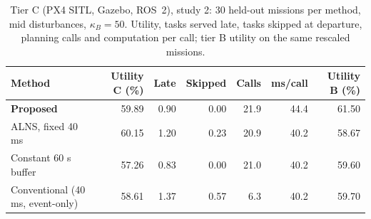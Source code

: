 \begin{table}[t]
\caption{Tier C (PX4 SITL, Gazebo, ROS~2), study 2: 30 held-out missions per method, mid disturbances, $\kappa_B=50$. Utility, tasks served late, tasks skipped at departure, planning calls and computation per call; tier B utility on the same rescaled missions.}\label{tab:s2tierc}
\centering\small
\begin{tabular}{lrrrrrr}
\toprule
Method & Utility C (\%) & Late & Skipped & Calls & ms/call & Utility B (\%) \\
\midrule
\textbf{Proposed} & 59.89 & 0.90 & 0.00 & 21.9 & 44.4 & 61.50 \\
ALNS, fixed 40 ms & 60.15 & 1.20 & 0.23 & 20.9 & 40.2 & 58.67 \\
Constant 60 s buffer & 57.26 & 0.83 & 0.00 & 21.0 & 40.2 & 59.60 \\
Conventional (40 ms, event-only) & 58.61 & 1.37 & 0.57 & 6.3 & 40.2 & 59.70 \\
\bottomrule
\end{tabular}
\end{table}
